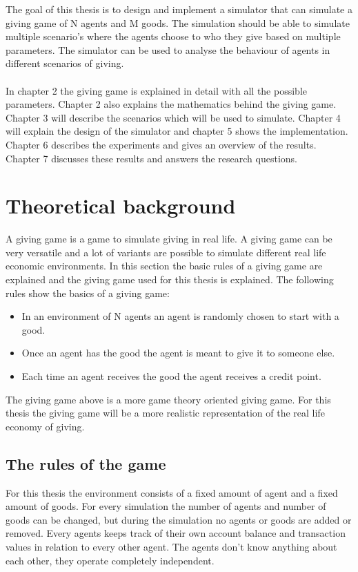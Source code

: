 \documentclass[twoside,openright]{uva-bachelor-thesis}
\begin{document}
The goal of this thesis is to design and implement a simulator that can simulate a giving game of N agents and M goods. The simulation should be able to simulate multiple scenario’s where the agents choose to who they give based on multiple parameters. The simulator can be used to analyse the behaviour of agents in different scenarios of giving.
\\
\\
In chapter 2 the giving game is explained in detail with all the possible parameters. Chapter 2 also explains the mathematics behind the giving game. Chapter 3 will describe the scenarios which will be used to simulate. Chapter 4 will explain the design of the simulator and chapter 5 shows the implementation. Chapter 6 describes the experiments and gives an overview of the results. Chapter 7 discusses these results and answers the research questions.


\chapter{Theoretical background}
A giving game is a game to simulate giving in real life. A giving game can be very versatile and a lot of variants are possible to simulate different real life economic environments. In this section the basic rules of a giving game are explained and the giving game used for this thesis is explained.
The following rules show the basics of a giving game:
\begin{itemize}
  \item In an environment of N agents an agent is randomly chosen to start with a good.
  \item Once an agent has the good the agent is meant to give it to someone else.
  \item Each time an agent receives the good the agent receives a credit point.
\end{itemize}
The giving game above is a more game theory oriented giving game. For this thesis the giving game will be a more realistic representation of the real life economy of giving.


\section{The rules of the game}
For this thesis the environment consists of a fixed amount of agent and a fixed amount of goods. For every simulation the number of agents and number of goods can be changed, but during the simulation no agents or goods are added or removed.  Every agents keeps track of their own account balance and transaction values in relation to every other agent. The agents don’t know anything about each other, they operate completely independent.
\end{document}

